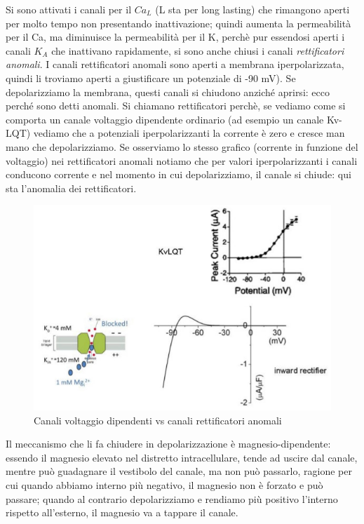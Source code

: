 \documentclass[a4paper,12pt]{article}
\begin{document}
Si sono attivati i canali per il $Ca_{L}$ (L sta per long lasting) che rimangono aperti per molto tempo non presentando inattivazione; quindi aumenta la permeabilità per il Ca, ma diminuisce la permeabilità per il K, perchè pur essendosi aperti i canali $K_{A}$ che inattivano rapidamente, si sono anche chiusi i canali \emph{rettificatori anomali}. I canali rettificatori anomali sono aperti a membrana iperpolarizzata, quindi li troviamo aperti a giustificare un potenziale di -90 mV).
Se depolarizziamo la membrana, questi canali si chiudono anziché aprirsi: ecco perché sono detti anomali. Si chiamano rettificatori perchè, se vediamo come si comporta un canale voltaggio dipendente ordinario (ad esempio un canale Kv-LQT) vediamo che a potenziali iperpolarizzanti la corrente è zero e cresce man mano che depolarizziamo. Se osserviamo lo stesso grafico (corrente in funzione del voltaggio) nei rettificatori anomali notiamo che per valori iperpolarizzanti i canali conducono corrente e nel momento in cui depolarizziamo, il canale si chiude: qui sta l'anomalia dei rettificatori.
\begin{figure}[H]
\centering
\includegraphics[scale=0.5]{immagine/ltq.jpg}
\caption{Canali voltaggio dipendenti vs canali rettificatori anomali}
\end{figure}
Il meccanismo che li fa chiudere in depolarizzazione è magnesio-dipendente: essendo il magnesio elevato nel distretto intracellulare, tende ad uscire dal canale, mentre può guadagnare il vestibolo del canale, ma non può passarlo, ragione per cui quando abbiamo interno più negativo, il magnesio non è forzato e può passare; quando al contrario depolarizziamo e rendiamo più positivo l'interno rispetto all'esterno, il magnesio va a tappare il canale.
\end{document}

